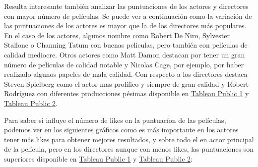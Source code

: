 \documentclass{article}
\begin{document}
Resulta interesante también analizar las puntuaciones de los actores y directores con mayor número de películas. Se puede ver a continuación como la variación de las puntuaciones de los actores es mayor que la de los directores más populares. En el caso de los actores, algunos nombre como Robert De Niro, Sylvester Stallone o Channing Tatum con buenas películas, pero también con películas de calidad mediocre. Otros actores como Matt Damon destacan por tener un gran número de películas de calidad notable y Nicolas Cage, por ejemplo, por haber realizado algunos papeles de mala calidad. Con respecto a los directores destaca Steven Spielberg como el actor mas prolífico y siempre de gran calidad y Robert Rodríguez con diferentes producciones pésimas disponible en \href{https://public.tableau.com/profile/javier6580\#!/vizhome/proyecto_fin_de_master_dataset/rating_actors}{Tableau Public 1} y \href{https://public.tableau.com/profile/javier6580\#!/vizhome/proyecto_fin_de_master_dataset/rating_directors}{Tableau Public 2}.

\begin{figure}[h]
\centering
{}
\end{figure}

\clearpage

Para saber si influye el número de likes en la puntuacíon de las películas, podemos ver en los siguientes gráficos como es más importante en los actores tener más likes para obtener mejores resultados, y sobre todo el en actor principal de la película, pero en los directores aunque con menos likes, las puntuaciones son superiores disponible en \href{https://public.tableau.com/profile/javier6580\#!/vizhome/proyecto_fin_de_master_dataset/likes_actors_rating}{Tableau Public 1} y \href{https://public.tableau.com/profile/javier6580\#!/vizhome/proyecto_fin_de_master_dataset/likes_director_rating}{Tableau Public 2}:
\end{document}
